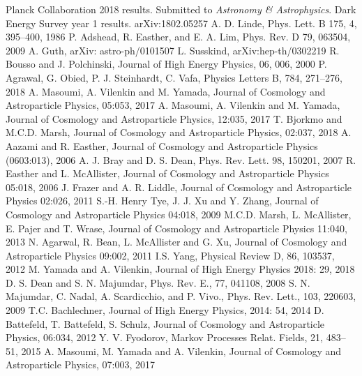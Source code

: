 \documentclass[12pt]{article}
\begin{document}
\begin{thebibliography}{99}
 Planck Collaboration 2018 results. Submitted to \emph{Astronomy \& Astrophysics}.
 Dark Energy Survey year 1 results. arXiv:1802.05257
 A. D. Linde, Phys. Lett. B 175, 4, 395--400, 1986
 P. Adshead, R. Easther, and E. A. Lim, Phys. Rev. D 79, 063504, 2009
 A. Guth, arXiv: astro-ph/0101507
 L. Susskind, arXiv:hep-th/0302219
 R. Bousso and J. Polchinski, Journal of High Energy Physics, 06, 006, 2000
 P. Agrawal, G. Obied, P. J. Steinhardt, C. Vafa, Physics Letters B, 784, 271--276, 2018
 A. Masoumi, A. Vilenkin and M. Yamada, Journal of Cosmology and Astroparticle Physics, 05:053, 2017
 A. Masoumi, A. Vilenkin and M. Yamada, Journal of Cosmology and Astroparticle Physics, 12:035, 2017
 T. Bjorkmo and M.C.D. Marsh, Journal of Cosmology and Astroparticle Physics, 02:037, 2018
 A. Aazami and R. Easther, Journal of Cosmology and Astroparticle Physics (0603:013), 2006
 A. J. Bray and D. S. Dean, Phys. Rev. Lett. 98, 150201, 2007
 R. Easther and L. McAllister, Journal of Cosmology and Astroparticle Physics 05:018, 2006
 J. Frazer and A. R. Liddle, Journal of Cosmology and Astroparticle Physics 02:026, 2011
 S.-H. Henry Tye, J. J. Xu and Y. Zhang, Journal of Cosmology and Astroparticle Physics 04:018, 2009
 M.C.D. Marsh, L. McAllister, E. Pajer and T. Wrase, Journal of Cosmology and Astroparticle Physics 11:040, 2013
 N. Agarwal, R. Bean, L. McAllister and G. Xu, Journal of Cosmology and Astroparticle Physics 09:002, 2011
 I.S. Yang, Physical Review D, 86, 103537, 2012
 M. Yamada and A. Vilenkin, Journal of High Energy Physics 2018: 29, 2018
 D. S. Dean and S. N. Majumdar, Phys. Rev. E., 77, 041108, 2008
 S. N. Majumdar, C. Nadal, A. Scardicchio, and P. Vivo., Phys. Rev. Lett., 103, 220603, 2009
 T.C. Bachlechner, Journal of High Energy Physics, 2014: 54, 2014
 D. Battefeld, T. Battefeld, S. Schulz, Journal of Cosmology and Astroparticle Physics, 06:034, 2012
 Y. V. Fyodorov, Markov Processes Relat. Fields, 21, 483--51, 2015
 A. Masoumi, M. Yamada and A. Vilenkin, Journal of Cosmology and Astroparticle Physics, 07:003, 2017

\end{thebibliography}
\end{document}
